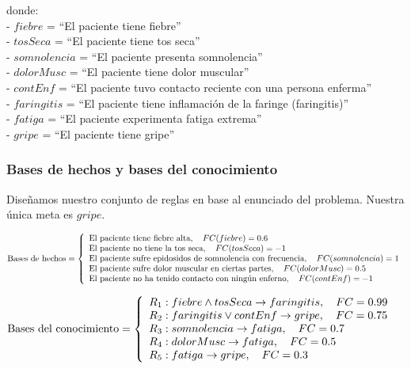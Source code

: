 \documentclass[a4paper,11pt, includehead]{article}
\begin{document}
\noindent donde:\\[1ex]
\indent - $fiebre$ = \textquotedblleft El paciente tiene fiebre\textquotedblright \\
\indent - $tosSeca$ = \textquotedblleft El paciente tiene tos seca\textquotedblright \\
\indent - $somnolencia$ = \textquotedblleft El paciente presenta somnolencia\textquotedblright \\
\indent - $dolorMusc$ = \textquotedblleft El paciente tiene dolor muscular\textquotedblright \\
\indent - $contEnf$ = \textquotedblleft El paciente tuvo contacto reciente con una persona enferma\textquotedblright \\
\indent - $faringitis$ = \textquotedblleft El paciente tiene inflamación de la faringe (faringitis)\textquotedblright \\
\indent - $fatiga$ = \textquotedblleft El paciente experimenta fatiga extrema\textquotedblright \\
\indent - $gripe$ = \textquotedblleft El paciente tiene gripe\textquotedblright \\

\subsubsection{Bases de hechos y bases del conocimiento}
Diseñamos nuestro conjunto de reglas en base al enunciado del problema. Nuestra única meta es $gripe$.

\vspace{4ex}

\noindent$
\text{Bases de hechos} =
\left\{ 
\begin{array}{l}
	\text{El paciente tiene fiebre alta},\quad FC (fiebre)=0.6 \cr
	\text{El paciente no tiene la tos seca},\quad FC (tosSeca)=-1 \cr
	\text{El paciente sufre epidosidos de somnolencia con frecuencia},\quad FC (somnolencia)=1 \cr
	\text{El paciente sufre dolor muscular en ciertas partes},\quad FC (dolorMusc)=0.5 \cr
	\text{El paciente no ha tenido contacto con ningún enferno},\quad FC (contEnf)=-1
\end{array} 
\right.
$

\vspace{4ex}

\noindent$
\text{Bases del conocimiento} =
\left\{ 
\begin{array}{l}
	R_1: fiebre \land tosSeca \rightarrow faringitis, \quad FC = 0.99 \cr
	R_2: faringitis \lor contEnf \rightarrow gripe, \quad FC = 0.75 \cr
	R_3: somnolencia \rightarrow fatiga, \quad FC = 0.7 \cr
	R_4: dolorMusc \rightarrow fatiga, \quad FC = 0.5 \cr
	R_5: fatiga \rightarrow gripe, \quad FC = 0.3 
\end{array} 
\right.
$
\end{document}
